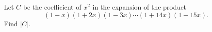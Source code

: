 Let $C$ be the coefficient of $x^2$ in the expansion of the product \[(1 - x)(1 + 2x)(1 - 3x)\cdots(1 + 14x)(1 - 15x).\]Find $|C|$.